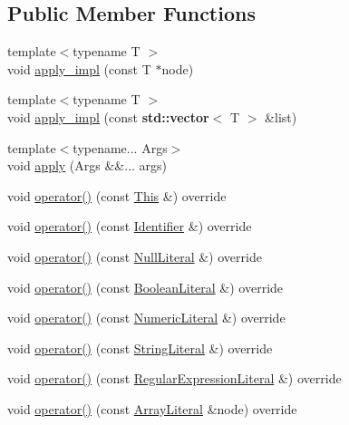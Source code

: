 \subsection*{Public Member Functions}
\begin{DoxyCompactItemize}
\item 
{\footnotesize template$<$typename T $>$ }\\void \hyperlink{struct_basic_visitor_aef8aa82a7e5149b6153f097af8daa647}{apply\+\_\+impl} (const T $\ast$node)
\item 
{\footnotesize template$<$typename T $>$ }\\void \hyperlink{struct_basic_visitor_a128388a75069690c9c108ce87b69cde8}{apply\+\_\+impl} (const \textbf{ std\+::vector}$<$ T $>$ \&list)
\item 
{\footnotesize template$<$typename... Args$>$ }\\void \hyperlink{struct_basic_visitor_a85afee760b9e02733ed01ff56a96f09c}{apply} (Args \&\&... args)
\item 
void \hyperlink{struct_basic_visitor_a15fc407e84d51dad443c3b7e135302ae}{operator()} (const \hyperlink{struct_this}{This} \&) override
\item 
void \hyperlink{struct_basic_visitor_ac9ae9d17e262b8c71696d978be89af4d}{operator()} (const \hyperlink{struct_identifier}{Identifier} \&) override
\item 
void \hyperlink{struct_basic_visitor_afc1fe7c3d76c98c6d489d98c66d773de}{operator()} (const \hyperlink{struct_null_literal}{Null\+Literal} \&) override
\item 
void \hyperlink{struct_basic_visitor_a2971ac256de1c7b0206b44f888d9abd5}{operator()} (const \hyperlink{struct_boolean_literal}{Boolean\+Literal} \&) override
\item 
void \hyperlink{struct_basic_visitor_a177e744fc03783b7fbb83d3292a7c029}{operator()} (const \hyperlink{struct_numeric_literal}{Numeric\+Literal} \&) override
\item 
void \hyperlink{struct_basic_visitor_a1e22bd82234168dd70579eabe84574ad}{operator()} (const \hyperlink{struct_string_literal}{String\+Literal} \&) override
\item 
void \hyperlink{struct_basic_visitor_a40d181efc4db66a595baaee6e78c65db}{operator()} (const \hyperlink{struct_regular_expression_literal}{Regular\+Expression\+Literal} \&) override
\item 
void \hyperlink{struct_basic_visitor_a0f625d975e964cda064bbc0f12f97558}{operator()} (const \hyperlink{struct_array_literal}{Array\+Literal} \&node) override

\end{DoxyCompactItemize}
